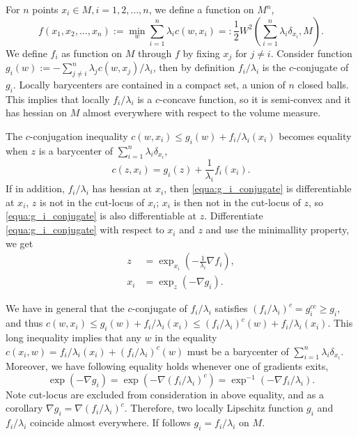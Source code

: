For $n$ points $x_i \in M, i=1,2,\ldots,n$, we define a function on $M^n$,
\[
	f(x_1, x_2, \ldots, x_n) := \min_{w} \sum_{i=1}^n \lambda_i c(w, x_i) =: \frac{1}{2}W^2(\sum_{i=1}^n \lambda_i \delta_{x_i}, M).
\]
We define $f_i$ as function on $M$ through $f$ by fixing $x_j$ for $j \neq i$.
Consider function $g_i(w) := -\sum_{j\neq i}^n \lambda_j c(w, x_j) / \lambda_i$,
then by definition $f_i /\lambda_i$ is the $c$-conjugate of $g_i$.
Locally barycenters are contained in a compact set, a union of $n$ closed balls.
This implies that locally $f_i / \lambda_i $ is a $c$-concave function,
so it is semi-convex and it has hessian on $M$ almost everywhere with respect to the volume measure.

The $c$-conjugation inequality
$ c(w, x_i) \leq g_i(w) + f_i / \lambda_i (x_i)$ 
becomes equality when $z$ is a barycenter of $\sum_{i=1}^{n} \lambda_i \delta_{x_i}$,
\begin{equation}
	\label{equa:g_i_conjugate}
	c(z, x_i) = g_i(z) + \frac{1}{\lambda_i} f_i(x_i).
\end{equation}
If in addition, $f_i / \lambda_i$ has hessian at $x_i$,
then \cref{equa:g_i_conjugate} is differentiable at $x_i$,
$z$ is not in the cut-locus of $x_i$;
$x_i$ is then not in the cut-locus of $z$,
so \cref{equa:g_i_conjugate} is also differentiable at $z$.
Differentiate \cref{equa:g_i_conjugate} with respect to $x_i$ and $z$ and use the minimallity property,
we get
\begin{align*}
	z &= \exp_{x_i}( - \frac{1}{\lambda_i} \nabla f_i),\\
	x_i &= \exp_{z}( - \nabla g_i).
\end{align*}

We have in general that the $c$-conjugate of $f_i / \lambda_i$ satisfies
$(f_i / \lambda_i)^c = g_i^{cc} \geq g_i$,
and thus $c(w, x_i) \leq g_i(w) + f_i/\lambda_i (x_i) \leq (f_i / \lambda_i)^c(w) + f_i/\lambda_i (x_i)$.
This long inequality implies that any $w$ in the equality
$c(x_i, w) = f_i / \lambda_i (x_i) + (f_i / \lambda_i)^c(w)$ must be a barycenter of $\sum_{i=1}^{n} \lambda_i \delta_{x_i}$.
Moreover, we have following equality holds whenever one of gradients exits,
\[\exp(-\nabla g_i) = \exp(-\nabla (f_i / \lambda_i)^c) = \exp^{-1}(-\nabla f_i / \lambda_i).\]
Note cut-locus are excluded from consideration in above equality,
and as a corollary $\nabla g_i = \nabla (f_i / \lambda_i)^c$.
Therefore, two locally Lipschitz function $g_i$ and $f_i /\lambda_i$ coincide almost everywhere.
If follows $g_i=f_i /\lambda_i$ on $M$.

